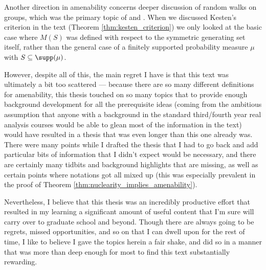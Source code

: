 Another direction in amenability concerns deeper discussion of random walks on groups, which was the primary topic of \cite{kesten_means} and \cite{kesten_random_walks}. When we discussed Kesten's criterion in the text (Theorem \ref{thm:kesten_criterion}) we only looked at the basic case where $M(S)$ was defined with respect to the symmetric generating set itself, rather than the general case of a finitely supported probability measure $\mu$ with $S\subseteq \supp(\mu)$.\newline

However, despite all of this, the main regret I have is that this text was ultimately a bit too scattered --- because there are so many different definitions for amenability, this thesis touched on so many topics that to provide enough background development for all the prerequisite ideas (coming from the ambitious assumption that anyone with a background in the standard third/fourth year real analysis courses would be able to glean most of the information in the text) would have resulted in a thesis that was even longer than this one already was. There were many points while I drafted the thesis that I had to go back and add particular bits of information that I didn't expect would be necessary, and there are certainly many tidbits and background highlights that are missing, as well as certain points where notations got all mixed up (this was especially prevalent in the proof of Theorem \ref{thm:nuclearity_implies_amenability}).\newline

Nevertheless, I believe that this thesis was an incredibly productive effort that resulted in my learning a significant amount of useful content that I'm sure will carry over to graduate school and beyond. Though there are always going to be regrets, missed opportunities, and so on that I can dwell upon for the rest of time, I like to believe I gave the topics herein a fair shake, and did so in a manner that was more than deep enough for most to find this text substantially rewarding.
